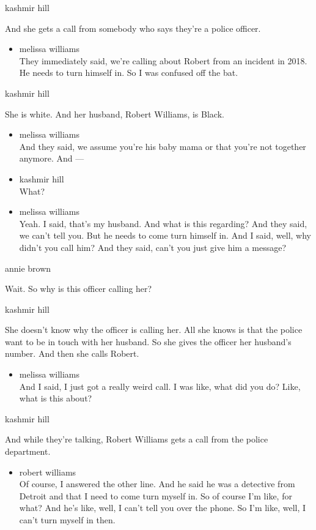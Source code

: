 kashmir hill

And she gets a call from somebody who says they're a police officer.

\begin{itemize}
\tightlist
\item
  melissa williams\\
  They immediately said, we're calling about Robert from an incident in
  2018. He needs to turn himself in. So I was confused off the bat.
\end{itemize}

kashmir hill

She is white. And her husband, Robert Williams, is Black.

\begin{itemize}
\item
  melissa williams\\
  And they said, we assume you're his baby mama or that you're not
  together anymore. And ---
\item
  kashmir hill\\
  What?
\item
  melissa williams\\
  Yeah. I said, that's my husband. And what is this regarding? And they
  said, we can't tell you. But he needs to come turn himself in. And I
  said, well, why didn't you call him? And they said, can't you just
  give him a message?
\end{itemize}

annie brown

Wait. So why is this officer calling her?

kashmir hill

She doesn't know why the officer is calling her. All she knows is that
the police want to be in touch with her husband. So she gives the
officer her husband's number. And then she calls Robert.

\begin{itemize}
\tightlist
\item
  melissa williams\\
  And I said, I just got a really weird call. I was like, what did you
  do? Like, what is this about?
\end{itemize}

kashmir hill

And while they're talking, Robert Williams gets a call from the police
department.

\begin{itemize}
\tightlist
\item
  robert williams\\
  Of course, I answered the other line. And he said he was a detective
  from Detroit and that I need to come turn myself in. So of course I'm
  like, for what? And he's like, well, I can't tell you over the phone.
  So I'm like, well, I can't turn myself in then.
\end{itemize}

